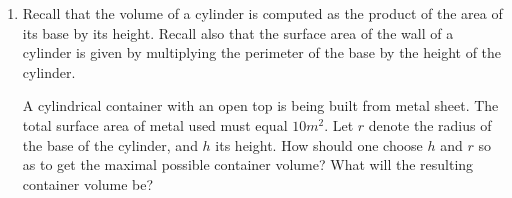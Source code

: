 \begin{enumerate}[ref={\fcProblemRef}]
\item Recall that the volume of a cylinder is computed as the product of the area of its base by its height. Recall also that the surface area of the wall of a cylinder is given by multiplying the perimeter of the base by the height of the cylinder. 

A cylindrical container with an open top is being built from metal sheet. The total surface area of metal used must equal $10m^2$. Let $r$ denote the radius of the base of the cylinder, and $h$ its height. How should one choose $h$ and $r$ so as to get the maximal possible container volume? What will the resulting container volume be?
\end{enumerate}
